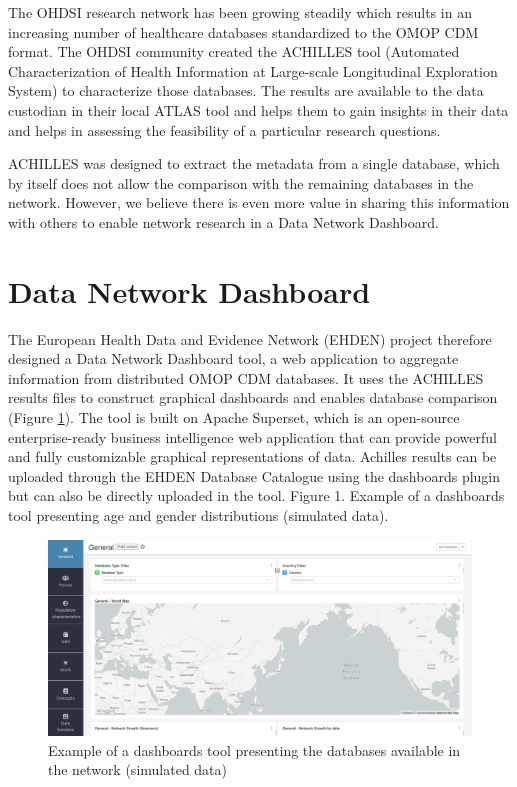 \documentclass[]{book}
\begin{document}
The OHDSI research network has been growing steadily which results in an
increasing number of healthcare databases standardized to the OMOP CDM
format. The OHDSI community created the ACHILLES tool (Automated
Characterization of Health Information at Large-scale Longitudinal
Exploration System) to characterize those databases. The results are
available to the data custodian in their local ATLAS tool and helps them
to gain insights in their data and helps in assessing the feasibility of
a particular research questions.

ACHILLES was designed to extract the metadata from a single database,
which by itself does not allow the comparison with the remaining
databases in the network. However, we believe there is even more value
in sharing this information with others to enable network research in a
Data Network Dashboard.

\section{Data Network Dashboard}\label{data-network-dashboard}

The European Health Data and Evidence Network (EHDEN) project therefore
designed a Data Network Dashboard tool, a web application to aggregate
information from distributed OMOP CDM databases. It uses the ACHILLES
results files to construct graphical dashboards and enables database
comparison (Figure \ref{fig:cdmBI}). The tool is built on Apache
Superset, which is an open-source enterprise-ready business intelligence
web application that can provide powerful and fully customizable
graphical representations of data. Achilles results can be uploaded
through the EHDEN Database Catalogue using the dashboards plugin but can
also be directly uploaded in the tool. Figure 1. Example of a dashboards
tool presenting age and gender distributions (simulated data).

\begin{figure}
\includegraphics[width=1\linewidth]{images/cdmBI} \caption{Example of a dashboards tool presenting the databases available in the network (simulated data)}\label{fig:cdmBI}
\end{figure}
\end{document}
